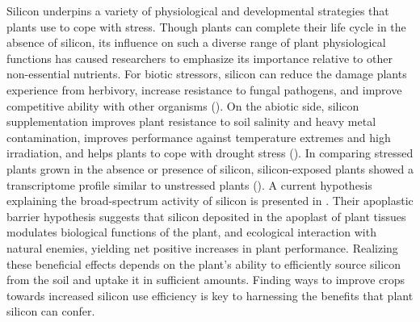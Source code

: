 \documentclass[12pt, letterpaper, ]{report}
\begin{document}
Silicon underpins a variety of physiological and developmental strategies that plants use to cope with stress. Though plants can complete their life cycle in the absence of silicon, its influence on such a diverse range of plant physiological functions has caused researchers to emphasize its importance relative to other non-essential nutrients. For biotic stressors, silicon can reduce the damage plants experience from herbivory, increase resistance to fungal pathogens, and improve competitive ability with other organisms (\cite{fauteux_silicon_2005, katz_silicon_2019}). On the abiotic side, silicon supplementation improves plant resistance to soil salinity and heavy metal contamination, improves performance against temperature extremes and high irradiation, and helps plants to cope with drought stress (\cite{cooke_consistent_2016}). In comparing stressed plants grown in the absence or presence of silicon, silicon-exposed plants showed a transcriptome profile similar to unstressed plants (\cite{coskun_controversies_2019}). A current hypothesis explaining the broad-spectrum activity of silicon is presented in  \textcite{coskun_controversies_2019}. Their apoplastic barrier hypothesis suggests that silicon deposited in the apoplast of plant tissues modulates biological functions of the plant, and ecological interaction with natural enemies, yielding net positive increases in plant performance. Realizing these beneficial effects depends on the plant’s ability to efficiently source silicon from the soil and uptake it in sufficient amounts. Finding ways to improve crops towards increased silicon use efficiency is key to harnessing the benefits that plant silicon can confer. 
\end{document}
